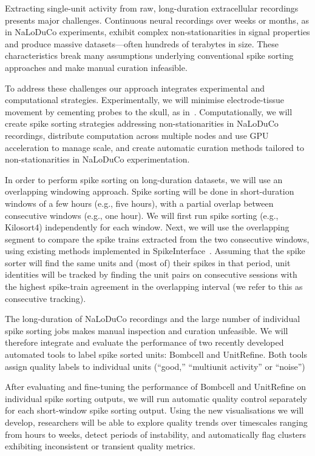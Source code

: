 Extracting single-unit activity from raw, long-duration extracellular
recordings presents major challenges. Continuous neural recordings over weeks
or months, as in NaLoDuCo experiments, exhibit complex non-stationarities in
signal properties and produce massive datasets—often hundreds of terabytes in
size. These characteristics break many assumptions underlying conventional
spike sorting approaches and make manual curation infeasible.

To address these challenges our approach integrates experimental and
computational strategies. Experimentally, we will minimise electrode-tissue
movement by cementing probes to the skull, as in~\cite{schoonoverEtAl21}.
Computationally, we will create spike sorting strategies addressing
non-stationarities in NaLoDuCo recordings, distribute computation across
multiple nodes and use GPU acceleration to manage scale, and create automatic
curation methods tailored to non-stationarities in NaLoDuCo experimentation.


In order to perform spike sorting on long-duration datasets, we will use an
overlapping windowing approach. Spike sorting will be done in short-duration
windows of a few hours (e.g., five hours), with a partial overlap between
consecutive windows (e.g., one hour).  We will first run spike sorting (e.g.,
Kilosort4) independently for each window. Next, we will use the overlapping
segment to compare the spike trains extracted from the two consecutive windows,
using existing methods implemented in SpikeInterface~\cite{buccinoEtAl20}. Assuming that
the spike sorter will find the same units and (most of) their spikes in that
period, unit identities will be tracked by finding the unit pairs on
consecutive sessions with the highest spike-train agreement in the overlapping
interval (we refer to this as consecutive tracking).


The long-duration of NaLoDuCo recordings and the large number of individual
spike sorting jobs makes manual inspection and curation unfeasible. We will
therefore integrate and evaluate the performance of two recently developed
automated tools to label spike sorted units: Bombcell\cite{fabreEtAl23} and
UnitRefine\cite{jainEtAl25}.  Both tools assign quality labels to individual
units (“good,” “multiunit activity” or “noise”)

After evaluating and fine-tuning the performance of Bombcell and UnitRefine on
individual spike sorting outputs, we will run automatic quality control
separately for each short-window spike sorting output. Using the new
visualisations we will develop, researchers will be able to explore quality
trends over timescales ranging from hours to weeks, detect periods of
instability, and automatically flag clusters exhibiting inconsistent or
transient quality metrics.

